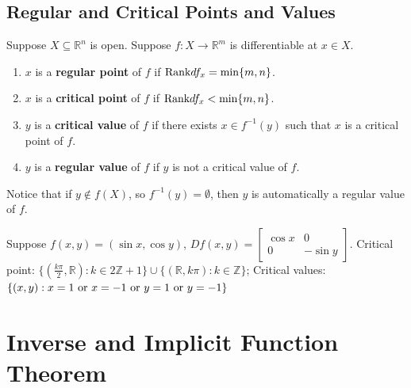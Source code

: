 \documentclass[11pt]{elegantbook}
\begin{document}
\subsection{Regular and Critical Points and Values}
\begin{definition}
    \normalfont
    Suppose $X \subseteq \mathbb{R}^n$ is open. Suppose $f : X \rightarrow \mathbb{R}^m$ is differentiable at $x \in X$.
    \begin{enumerate}
        \item $x$ is a \textbf{regular point} of $f$ if $\textnormal{Rank} df_x=\min\{m,n\}$.
        \item $x$ is a \textbf{critical point} of $f$ if $\textnormal{Rank} df_x<\min\{m,n\}$.
        \item $y$ is a \textbf{critical value} of $f$ if  there exists $x \in f^{-1}(y)$ such that $x$ is a critical point of $f$.
        \item $y$ is a \textbf{regular value} of $f$ if $y$ is not a critical value of $f$.
    \end{enumerate}
\end{definition}
\begin{note}
    Notice that if $y \notin f(X)$, so $f^{-1}(y) = \emptyset$, then $y$ is automatically a regular value of $f$.
\end{note}

\begin{example}
    Suppose $f(x,y)=(\sin x,\cos y)$, $Df(x,y)=\begin{bmatrix}
        \cos x&	0\\
        0&	-\sin y
    \end{bmatrix}$. Critical point: $\{(\frac{k\pi}{2}, \mathbb{R}): k\in 2\mathbb{Z}+1\}\cup\{(\mathbb{R},k\pi): k\in \mathbb{Z}\}$; Critical values: $\{(x,y): x=1\textnormal{ or }x=-1 \textnormal{ or }y=1\textnormal{ or }y=-1\}$
\end{example}


\section{Inverse and Implicit Function Theorem}
\end{document}
